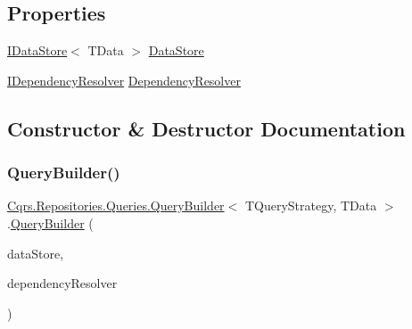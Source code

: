 \subsection*{Properties}
\begin{DoxyCompactItemize}
\item 
\hyperlink{interfaceCqrs_1_1DataStores_1_1IDataStore}{I\+Data\+Store}$<$ T\+Data $>$ \hyperlink{classCqrs_1_1Repositories_1_1Queries_1_1QueryBuilder_a8a64851b3bf82ed5d2e708cd39d71890}{Data\+Store}
\item 
\hyperlink{interfaceCqrs_1_1Configuration_1_1IDependencyResolver}{I\+Dependency\+Resolver} \hyperlink{classCqrs_1_1Repositories_1_1Queries_1_1QueryBuilder_aef22b10001de3e15a2817f8446a5b5f4}{Dependency\+Resolver}
\end{DoxyCompactItemize}


\subsection{Constructor \& Destructor Documentation}
\mbox{\label{classCqrs_1_1Repositories_1_1Queries_1_1QueryBuilder_a8a7b6495f78adedc7b7a82d2c83f17d5}} 
\subsubsection{\texorpdfstring{Query\+Builder()}{QueryBuilder()}}
{\footnotesize\ttfamily \hyperlink{classCqrs_1_1Repositories_1_1Queries_1_1QueryBuilder}{Cqrs.\+Repositories.\+Queries.\+Query\+Builder}$<$ T\+Query\+Strategy, T\+Data $>$.\hyperlink{classCqrs_1_1Repositories_1_1Queries_1_1QueryBuilder}{Query\+Builder} (\begin{DoxyParamCaption}\item[{\hyperlink{interfaceCqrs_1_1DataStores_1_1IDataStore}{I\+Data\+Store}$<$ T\+Data $>$}]{data\+Store,  }\item[{\hyperlink{interfaceCqrs_1_1Configuration_1_1IDependencyResolver}{I\+Dependency\+Resolver}}]{dependency\+Resolver }\end{DoxyParamCaption})\hspace{0.3cm}{\ttfamily [protected]}}



